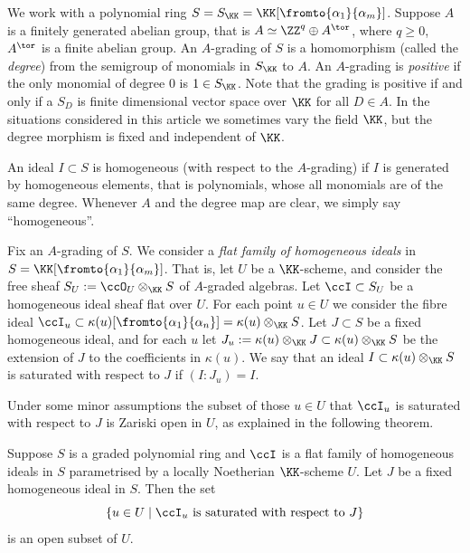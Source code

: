 \documentclass[12pt,a4paper]{article}
\begin{document}
We work with a polynomial ring $S=S_{\KK}= \KK[\fromto{\alpha_1}{\alpha_m}]$.
Suppose $A$ is a finitely generated abelian group,
that is $A\simeq \ZZ^q \oplus A^{\tor}$, where $q\geqslant 0$, $A^{\tor}$ is a finite abelian group.
An $A$-grading of $S$ is a homomorphism (called the \emph{degree}) from the semigroup of monomials in $S_{\KK}$ to $A$.
An $A$-grading is \emph{positive} if the only monomial of degree $0$ is $1\in S_{\KK}$.
Note that the grading is positive if and only if a
$S_D$ is finite dimensional vector space over $\KK$ for all $D\in A$.
In the situations considered in this article we  sometimes vary the field $\KK$, but  the degree morphism
is fixed and independent of $\KK$.

An ideal $I \subset S$ is homogeneous (with respect to the $A$-grading) if $I$ is generated by homogeneous elements,
that is polynomials, whose all monomials are of the same degree.
Whenever $A$ and the degree map are clear, we simply say ``homogeneous''.

Fix an $A$-grading of $S$. We consider a \emph{flat family of homogeneous ideals} in
  $S= \KK[\fromto{\alpha_1}{\alpha_m}]$.
That is, let $U$ be a $\KK$-scheme, and consider the free sheaf $S_U:=\ccO_U \otimes_{\KK} S$ of $A$-graded algebras. Let $\ccI \subset S_U$ be a homogeneous ideal sheaf flat over $U$. For each point $u\in U$ we consider the fibre ideal $\ccI_u\subset \kappa(u)[\fromto{\alpha_1}{\alpha_n}]= \kappa(u) \otimes_{\KK} S$.
Let $J\subset S$ be a fixed homogeneous ideal, and for each $u$ let $J_u:= \kappa(u) \otimes_{\KK} J \subset \kappa(u) \otimes_{\KK} S$ be the extension of $J$ to the coefficients in $\kappa(u)$. We say that an ideal $I\subset \kappa(u) \otimes_{\KK} S$ is saturated with respect to $J$ if $(I: J_u)= I$.



Under some minor assumptions the subset  of those $u\in U$ that $\ccI_u$ is saturated with respect to $J$ is Zariski open in $U$,
as explained in the following theorem.
\begin{thm}\label{thm_saturation_is_open_property}
   Suppose $S$ is a graded polynomial ring and
      $\ccI$ is a flat family of homogeneous ideals in $S$
      parametrised by a locally Noetherian $\KK$-scheme $U$.
   Let $J$ be a fixed homogeneous ideal in $S$.
   Then the set
        \[
            \left\{ u\in U \mid  \ccI_u \text{ is saturated with respect to $J$} \right\}
        \]
        is an open subset of $U$.
\end{thm}
\end{document}
